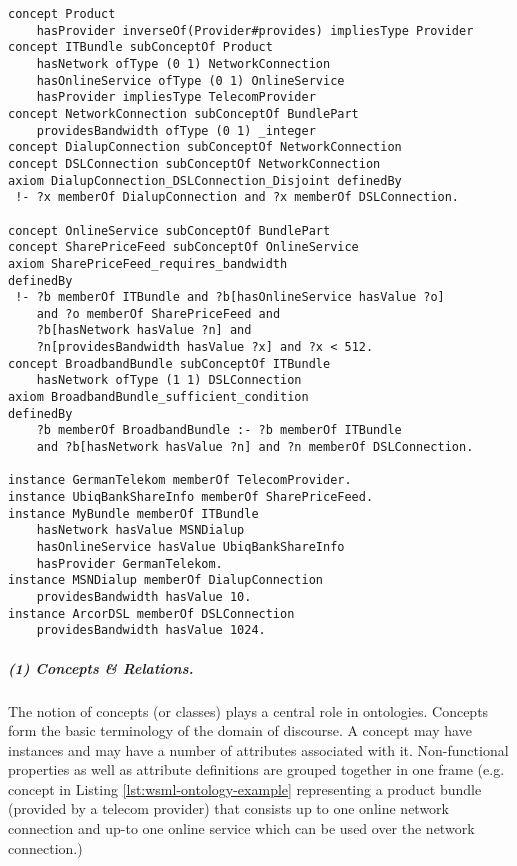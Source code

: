\begin{lstlisting}[label=lst:wsml-ontology-example,style=wsml, caption=WSML Example Ontology]
concept Product
    hasProvider inverseOf(Provider#provides) impliesType Provider
concept ITBundle subConceptOf Product
    hasNetwork ofType (0 1) NetworkConnection
    hasOnlineService ofType (0 1) OnlineService
    hasProvider impliesType TelecomProvider
concept NetworkConnection subConceptOf BundlePart
    providesBandwidth ofType (0 1) _integer
concept DialupConnection subConceptOf NetworkConnection
concept DSLConnection subConceptOf NetworkConnection
axiom DialupConnection_DSLConnection_Disjoint definedBy
 !- ?x memberOf DialupConnection and ?x memberOf DSLConnection.

concept OnlineService subConceptOf BundlePart
concept SharePriceFeed subConceptOf OnlineService
axiom SharePriceFeed_requires_bandwidth
definedBy
 !- ?b memberOf ITBundle and ?b[hasOnlineService hasValue ?o]
    and ?o memberOf SharePriceFeed and
    ?b[hasNetwork hasValue ?n] and
    ?n[providesBandwidth hasValue ?x] and ?x < 512.
concept BroadbandBundle subConceptOf ITBundle
    hasNetwork ofType (1 1) DSLConnection
axiom BroadbandBundle_sufficient_condition
definedBy
    ?b memberOf BroadbandBundle :- ?b memberOf ITBundle
    and ?b[hasNetwork hasValue ?n] and ?n memberOf DSLConnection.

instance GermanTelekom memberOf TelecomProvider.
instance UbiqBankShareInfo memberOf SharePriceFeed.
instance MyBundle memberOf ITBundle
    hasNetwork hasValue MSNDialup
    hasOnlineService hasValue UbiqBankShareInfo
    hasProvider GermanTelekom.
instance MSNDialup memberOf DialupConnection
    providesBandwidth hasValue 10.
instance ArcorDSL memberOf DSLConnection
    providesBandwidth hasValue 1024.

\end{lstlisting}

\subparagraph{\it \bfseries (1) Concepts \& Relations.} The notion of concepts
(or classes) plays a central role in ontologies. Concepts form the
basic terminology of the domain of discourse. A concept may have
instances and may have a number of attributes associated with it.
Non-functional properties as well
as attribute definitions are grouped together in one frame (e.g.
concept  in Listing \ref{lst:wsml-ontology-example}
representing a product bundle (provided by
a telecom provider) that consists up to one online network
connection and up-to one online service which can be used over the
network connection.)

